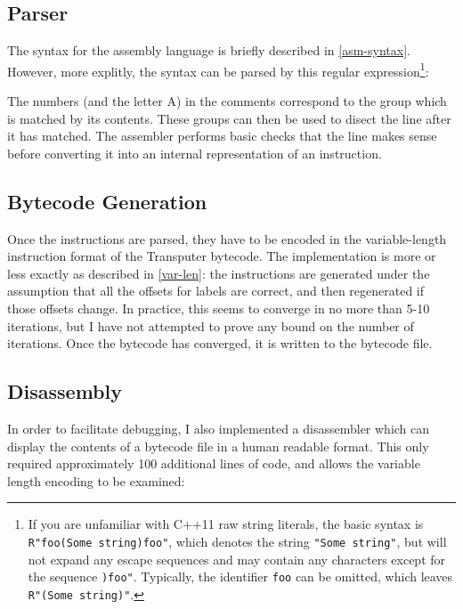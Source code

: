 \subsection{Parser}

The syntax for the assembly language is briefly described in \ref{asm-syntax}.
However, more explitly, the syntax can be parsed by this regular
expression\footnote{If you are unfamiliar with C++11 raw string literals, the
basic syntax is \texttt{R"foo(Some string)foo"}, which denotes the string
\texttt{"Some string"}, but will not expand any escape sequences and may contain
any characters except for the sequence \texttt{)foo"}. Typically, the identifier
\texttt{foo} can be omitted, which leaves \texttt{R"(Some string)"}.}:


The numbers (and the letter A) in the comments correspond to the group which is
matched by its contents. These groups can then be used to disect the line after
it has matched.  The assembler performs basic checks that the line makes sense
before converting it into an internal representation of an instruction.

\subsection{Bytecode Generation}

Once the instructions are parsed, they have to be encoded in the variable-length
instruction format of the Transputer bytecode. The implementation is more or
less exactly as described in \ref{var-len}: the instructions are generated under
the assumption that all the offsets for labels are correct, and then regenerated
if those offsets change. In practice, this seems to converge in no more than
5-10 iterations, but I have not attempted to prove any bound on the number of
iterations. Once the bytecode has converged, it is written to the bytecode file.

\subsection{Disassembly}

In order to facilitate debugging, I also implemented a disassembler which can
display the contents of a bytecode file in a human readable format. This only
required approximately 100 additional lines of code, and allows the variable
length encoding to be examined:

\begin{minipage}{.3\textwidth}
  
\end{minipage}
\begin{minipage}{.6\textwidth}
  
\end{minipage}

